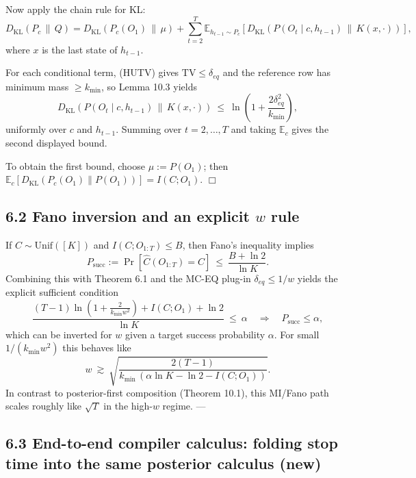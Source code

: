 \documentclass[11pt]{article}
\begin{document}
Now apply the chain rule for KL: \[
D_{\mathrm{KL}}(P_c \,\|\, Q)
= D_{\mathrm{KL}}(P_c(O_1)\,\|\,\mu) + \sum_{t=2}^T \mathbb E_{h_{t-1}\sim P_c}\!\left[D_{\mathrm{KL}}\!\left(P(O_t\mid c,h_{t-1})\,\|\,K(x,\cdot)\right)\right],
\] where \(x\) is the last state of \(h_{t-1}\).

For each conditional term, (HUTV) gives \(\mathrm{TV}\le \delta_{eq}\)
and the reference row has minimum mass \(\ge k_{\min}\), so Lemma 10.3
yields \[
D_{\mathrm{KL}}\!\left(P(O_t\mid c,h_{t-1})\,\|\,K(x,\cdot)\right)\ \le\ \ln\!\left(1+\frac{2\delta_{eq}^2}{k_{\min}}\right),
\] uniformly over \(c\) and \(h_{t-1}\). Summing over \(t=2,\dots,T\)
and taking \(\mathbb E_c\) gives the second displayed bound.

To obtain the first bound, choose \(\mu:=P(O_1)\); then
\(\mathbb E_c[D_{\mathrm{KL}}(P_c(O_1)\|P(O_1))]=I(C;O_1)\). \(\Box\)

\hypertarget{fano-inversion-and-an-explicit-w-rule}{%
\subsection{\texorpdfstring{6.2 Fano inversion and an explicit \(w\)
rule}{6.2 Fano inversion and an explicit w rule}}\label{fano-inversion-and-an-explicit-w-rule}}

If \(C\sim\mathrm{Unif}([K])\) and \(I(C;O_{1:T})\le B\), then Fano's
inequality implies \[
P_{\mathrm{succ}} := \Pr[\widehat C(O_{1:T})=C] \ \le\ \frac{B+\ln 2}{\ln K}.
\] Combining this with Theorem 6.1 and the MC-EQ plug-in
\(\delta_{eq}\le 1/w\) yields the explicit sufficient condition \[
\frac{(T-1)\ln\!\left(1+\frac{2}{k_{\min}w^2}\right)+I(C;O_1)+\ln 2}{\ln K}\ \le\ \alpha
\quad\Rightarrow\quad
P_{\mathrm{succ}}\le \alpha,
\] which can be inverted for \(w\) given a target success probability
\(\alpha\). For small \(1/(k_{\min}w^2)\) this behaves like \[
w \ \gtrsim\ \sqrt{\frac{2(T-1)}{k_{\min}\,(\alpha\ln K-\ln 2-I(C;O_1))}}.
\] In contrast to posterior-first composition (Theorem 10.1), this
MI/Fano path scales roughly like \(\sqrt{T}\) in the high-\(w\) regime.
---

\hypertarget{end-to-end-compiler-calculus-folding-stop-time-into-the-same-posterior-calculus-new}{%
\subsection{6.3 End-to-end compiler calculus: folding stop time into the
same posterior calculus
(new)}\label{end-to-end-compiler-calculus-folding-stop-time-into-the-same-posterior-calculus-new}}
\end{document}
